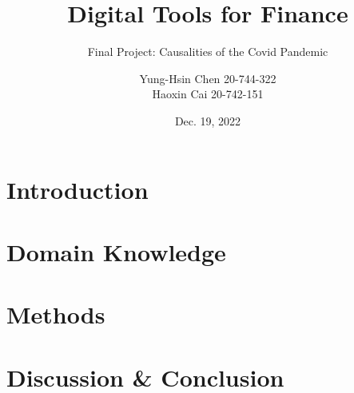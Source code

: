 \documentclass{beamer}
\title[Final Project Presentation]{Digital Tools for Finance}
\subtitle{Final Project: Causalities of the Covid Pandemic}
\author[Y. Chen, H. Cai]{Yung-Hsin Chen 20-744-322
\\ Haoxin Cai 20-742-151}
\institute[IfI, UZH]{Department of Informatics\\University of Zurich}
\date{Dec. 19, 2022}
\begin{document}
\begin{frame}
\titlepage
\end{frame}


\section{Introduction}


\section{Domain Knowledge}


\section{Methods}


\section{Discussion \& Conclusion}



%     
%     
\end{document}
